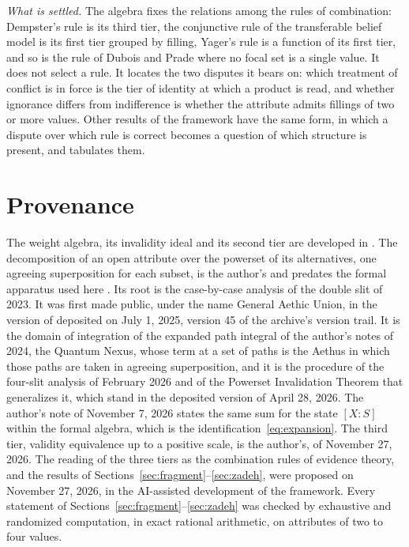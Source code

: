 \emph{What is settled.} The algebra fixes the relations among the rules of combination: Dempster's rule is its third tier, the conjunctive rule of the transferable belief model is its first tier grouped by filling, Yager's rule is a function of its first tier, and so is the rule of Dubois and Prade where no focal set is a single value. It does not select a rule. It locates the two disputes it bears on: which treatment of conflict is in force is the tier of identity at which a product is read, and whether ignorance differs from indifference is whether the attribute admits fillings of two or more values. Other results of the framework have the same form, in which a dispute over which rule is correct becomes a question of which structure is present, and \cite{AethusBrief} tabulates them.

\section*{Provenance}

\noindent The weight algebra, its invalidity ideal and its second tier are developed in \cite{Aethus, AethusTree}. The decomposition of an open attribute over the powerset of its alternatives, one agreeing superposition for each subset, is the author's and predates the formal apparatus used here \cite{Aethus}. Its root is the case-by-case analysis of the double slit of 2023. It was first made public, under the name General Aethic Union, in the version of \cite{Aethus} deposited on July 1, 2025, version 45 of the archive's version trail. It is the domain of integration of the expanded path integral of the author's notes of 2024, the Quantum Nexus, whose term at a set of paths is the Aethus in which those paths are taken in agreeing superposition, and it is the procedure of the four-slit analysis of February 2026 and of the Powerset Invalidation Theorem that generalizes it, which stand in the deposited version of April 28, 2026. The author's note of November 7, 2026 states the same sum for the state $[X:S]$ within the formal algebra, which is the identification~\eqref{eq:expansion}. The third tier, validity equivalence up to a positive scale, is the author's, of November 27, 2026. The reading of the three tiers as the combination rules of evidence theory, and the results of Sections~\ref{sec:fragment}--\ref{sec:zadeh}, were proposed on November 27, 2026, in the AI-assisted development of the framework. Every statement of Sections~\ref{sec:fragment}--\ref{sec:zadeh} was checked by exhaustive and randomized computation, in exact rational arithmetic, on attributes of two to four values.

\printbibliography

